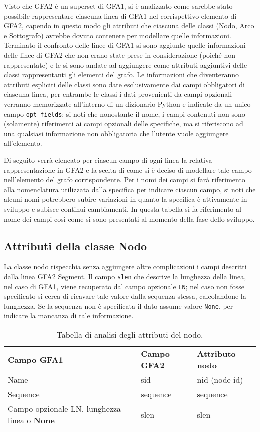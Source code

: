 Visto che GFA2 è un superset di GFA1, si è analizzato come sarebbe stato
possibile rappresentare ciascuna linea di GFA1 nel corrispettivo elemento
di GFA2, capendo in questo modo gli attributi che ciascuna delle classi (Nodo, Arco
e Sottografo) avrebbe dovuto contenere per modellare quelle informazioni.
Terminato il confronto delle linee di GFA1 si sono aggiunte quelle
informazioni delle linee di GFA2 che non erano state prese in considerazione
(poiché non rappresentate) e le si sono andate ad aggiungere come attributi
aggiuntivi delle classi rappresentanti gli elementi del grafo.
Le informazioni che diventeranno attributi espliciti delle classi sono date
esclusivamente dai campi obbligatori di ciascuna linea, per entrambe le
classi i dati provenienti da campi opzionali verranno memorizzate
all'interno di un dizionario Python e indicate da un unico campo
\texttt{opt\_fields}; si noti che nonostante il nome, i campi contenuti
non sono (solamente) riferimenti ai campi opzionali delle specifiche,
ma si riferiscono ad una qualsiasi informazione non obbligatoria
che l'utente vuole aggiungere all'elemento.

Di seguito verrà elencato per ciascun campo di ogni linea la relativa rappresentazione
in GFA2 e la scelta di come si è deciso di modellare tale campo nell'elemento
del grafo corrispondente. Per i nomi dei campi si farà riferimento alla nomenclatura
utilizzata dalla specifica per indicare ciascun campo, si noti
che alcuni nomi potrebbero subire variazioni in quanto la specifica è attivamente
in sviluppo e subisce continui cambiamenti. In questa tabella si fa riferimento
al nome dei campi così come si sono presentati al momento della fase dello
sviluppo.

\subsection{Attributi della classe Nodo}
La classe nodo rispecchia senza aggiungere altre complicazioni
i campi descritti dalla linea GFA2 Segment.
Il campo \texttt{slen} che descrive la lunghezza della linea, nel
caso di GFA1, viene recuperato dal campo opzionale \texttt{LN};
nel caso non fosse specificato si cerca di ricavare tale valore
dalla sequenza stessa, calcolandone la lunghezza. Se la
sequenza non è specificata il dato assume valore \texttt{None}, per
indicare la mancanza di tale informazione.
\noindent
\begin{table}[h]
	\begin{tabularx}{\textwidth}{ | X | X | X |}
		\hline
		\textbf{Campo GFA1}	&	\textbf{Campo GFA2}	&	\textbf{Attributo nodo}\\
		Name				&	sid					&	nid (node id)\\
		Sequence				&	sequence				&	sequence\\
		Campo opzionale LN, lunghezza linea o \mbox{\textbf{None}}	&	slen	& slen\\
		\hline
	\end{tabularx}
	\caption{Tabella di analisi degli attributi del nodo.}
	\label{tab:node-analysis}
\end{table}


